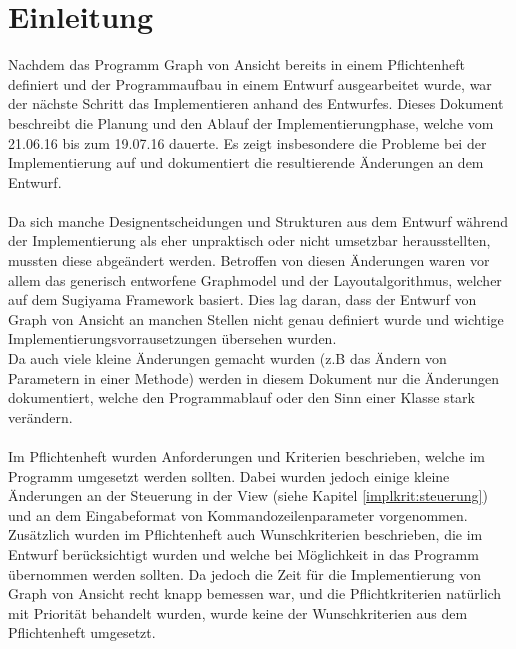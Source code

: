 \chapter{Einleitung}
\label{ch:einleitung}

Nachdem das Programm \glqq Graph von Ansicht\grqq{} bereits in einem Pflichtenheft definiert und der Programmaufbau in einem Entwurf ausgearbeitet wurde, war der nächste Schritt das Implementieren anhand des Entwurfes.
Dieses Dokument beschreibt die Planung und den Ablauf der Implementierungphase, welche vom 21.06.16 bis zum 19.07.16 dauerte. Es zeigt insbesondere die Probleme bei der Implementierung auf und dokumentiert die resultierende Änderungen an dem Entwurf.\\
\\
Da sich manche Designentscheidungen und Strukturen aus dem Entwurf während der Implementierung als eher unpraktisch oder nicht umsetzbar herausstellten, mussten diese abgeändert werden. 
Betroffen von diesen Änderungen waren vor allem das generisch entworfene Graphmodel und der Layoutalgorithmus, welcher auf dem Sugiyama Framework basiert.
Dies lag daran, dass der Entwurf von \glqq Graph von Ansicht\grqq{} an manchen Stellen nicht genau definiert wurde und wichtige Implementierungsvorrausetzungen übersehen wurden. \\ 
Da auch viele kleine Änderungen gemacht wurden (z.B das Ändern von Parametern in einer Methode) werden in diesem Dokument nur die Änderungen dokumentiert, welche den Programmablauf oder den Sinn einer Klasse stark verändern. \\
\\
Im Pflichtenheft wurden Anforderungen und Kriterien beschrieben, welche im Programm umgesetzt werden sollten. Dabei wurden jedoch einige kleine Änderungen an der Steuerung in der View (siehe Kapitel \ref{implkrit:steuerung}) und an dem Eingabeformat von Kommandozeilenparameter vorgenommen.  \\

Zusätzlich wurden im Pflichtenheft auch Wunschkriterien beschrieben, die im Entwurf berücksichtigt wurden und welche bei Möglichkeit in das Programm übernommen werden sollten. Da jedoch die Zeit für die Implementierung von \glqq Graph von Ansicht\grqq{} recht knapp bemessen war, und die Pflichtkriterien natürlich mit Priorität behandelt wurden, wurde keine der Wunschkriterien aus dem Pflichtenheft umgesetzt.